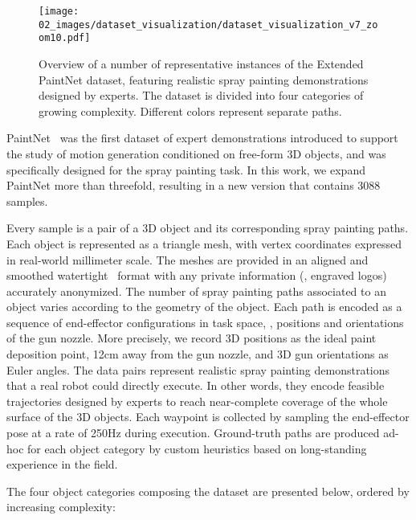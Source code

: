 \begin{figure*}[!t]
    \centering
    \texttt{[image: 02\_images/dataset\_visualization/dataset\_visualization\_v7\_zoom10.pdf]}
    \caption{Overview of a number of representative instances of the Extended PaintNet dataset, featuring realistic spray painting demonstrations designed by experts. The dataset is divided into four categories of growing complexity.
    Different colors represent separate paths.
    }
    \label{fig:dataset_overview}
    \vspace{-6pt}
\end{figure*}

PaintNet~\cite{tiboni2023paintnet} was the first dataset of expert demonstrations introduced to support the study of motion generation conditioned on free-form 3D objects, and was specifically designed for the spray painting task. In this work, we expand PaintNet more than threefold, resulting in a new version that contains 3088 samples.

Every sample is a pair of a 3D object and its corresponding spray painting paths. Each object is represented as a triangle mesh, with vertex coordinates expressed in real-world millimeter scale. The meshes are provided in an aligned and smoothed watertight~\cite{Huang_Robust_2018} format with any private information (\eg, engraved logos) accurately anonymized.
%
The number of spray painting paths associated to an object varies according to the geometry of the object. Each path is encoded as a sequence of end-effector configurations in task space, \ie, positions and orientations of the gun nozzle. More precisely, we record 3D positions as the ideal paint deposition point, 12cm away from the gun nozzle, and 3D gun orientations as Euler angles.
%
The data pairs represent realistic spray painting demonstrations that a real robot could directly execute. In other words, they encode feasible trajectories designed by experts to reach near-complete coverage of the whole surface of the 3D objects. Each waypoint is collected by sampling the end-effector pose at a rate of 250Hz during execution. 
%
Ground-truth paths are produced ad-hoc for each object category by custom heuristics based on long-standing experience in the field.

The four object categories composing the dataset are presented below, ordered by increasing complexity:

